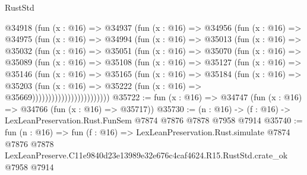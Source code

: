 \begin{lexlean}{RustStd}
\begin{coremodule}
                @34918
                  (fun (x : @16) =>
                  @34937
                    (fun (x : @16) =>
                    @34956
                      (fun (x : @16) =>
                      @34975
                        (fun (x : @16) =>
                        @34994
                          (fun (x : @16) =>
                          @35013
                            (fun (x : @16) =>
                            @35032
                              (fun (x : @16) =>
                              @35051
                                (fun (x : @16) =>
                                @35070
                                  (fun (x : @16) =>
                                  @35089
                                    (fun (x : @16) =>
                                    @35108
                                      (fun (x : @16) =>
                                      @35127
                                        (fun (x : @16) =>
                                        @35146
                                          (fun (x : @16) =>
                                          @35165
                                            (fun (x : @16) =>
                                            @35184
                                              (fun (x : @16) =>
                                              @35203
                                                (fun (x : @16) =>
                                                @35222
                                                  (fun (x : @16) => @35669))))))))))))))))))))))))
@35722 := fun (x : @16) => @34747 (fun (x : @16) => @34766 (fun (x : @16) => @35717))
@35730 := (n : @16) -> (f : @16) -> LexLeanPreservation.Rust.FunSem @7874 @7876 @7878 @7958 @7914
@35740 := fun (n : @16) =>
  fun (f : @16) =>
  LexLeanPreservation.Rust.simulate
    @7874
    @7876
    @7878
    LexLeanPreserve.C11e9840d23e13989e32e676c4caf4624.R15.RustStd.crate_ok
    @7958
    @7914
\end{coremodule}
\end{lexlean}
